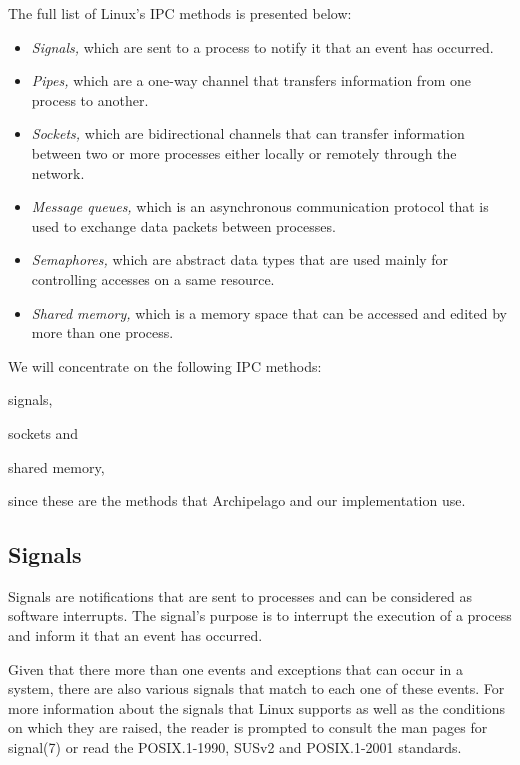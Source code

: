 The full list of Linux's IPC methods is presented below:

\begin{itemize}
	\item \textit{Signals,} which are sent to a process to notify it that 
		an event has occurred.
	\item \textit{Pipes,} which are a one-way channel that transfers 
		information from one process to another.
	\item \textit{Sockets,} which are bidirectional channels that can 
		transfer information between two or more processes either 
		locally or remotely through the network.
	\item \textit{Message queues,} which is an asynchronous communication 
		protocol that is used to exchange data packets between 
		processes.
	\item \textit{Semaphores,} which are abstract data types that are used 
		mainly for controlling accesses on a same resource.
	\item \textit{Shared memory,} which is a memory space that can be 
		accessed and edited by more than one process.
\end{itemize}

We will concentrate on the following IPC methods:
\begin{inparaenum}[i)]
\item signals,
\item sockets and
\item shared memory,
\end{inparaenum}
since these are the methods that Archipelago and our implementation use.

\subsection{Signals}

Signals are notifications that are sent to processes and can be considered as 
software interrupts. The signal's purpose is to interrupt the execution of a
process and inform it that an event has occurred.

Given that there more than one events and exceptions that can occur in a 
system, there are also various signals that match to each one of these
events. For more information about the signals that Linux supports as well as 
the conditions on which they are raised, the reader is prompted to consult the 
man pages for signal(7) or read the POSIX.1-1990, SUSv2 and POSIX.1-2001 
standards.
  
